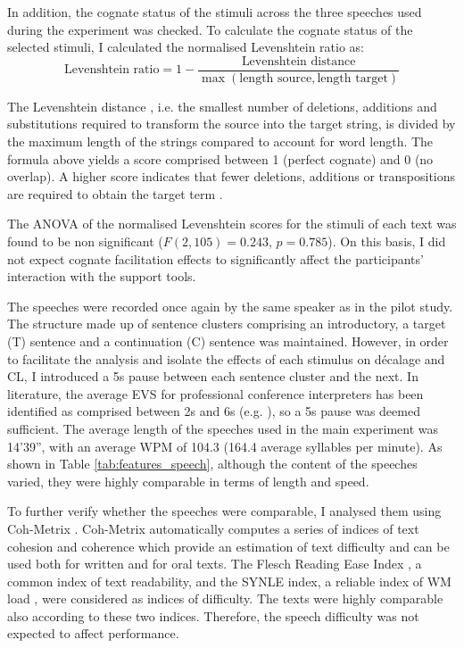 In addition, the cognate status of the stimuli across the three speeches used during the experiment was checked. To calculate the cognate status of the selected stimuli, I calculated the normalised Levenshtein ratio as:
\[\text{Levenshtein ratio}=1 - \frac{\text{Levenshtein distance}}{\max(\text{length source}, \text{length target})}\]

The Levenshtein distance \citep{levenshtein_binary_1966}, i.e. the smallest number of deletions, additions and substitutions required to transform the source into the target string, is divided by the maximum length of the strings compared to account for word length. The formula above yields a score comprised between 1 (perfect cognate) and 0 (no overlap). A higher score indicates that fewer deletions, additions or transpositions are required to obtain the target term \citep{schepens_distributions_2012}.

The ANOVA of the normalised Levenshtein scores for the stimuli of each text was found to be non significant ($F(2,105)=0.243$, $p=0.785$). On this basis, I did not expect cognate facilitation effects to significantly affect the participants' interaction with the support tools.

The speeches were recorded once again by the same speaker as in the pilot study. The structure made up of sentence clusters comprising an introductory, a target (T) sentence and a continuation (C) sentence was maintained. However, in order to facilitate the analysis and isolate the effects of each stimulus on décalage and CL, I introduced a 5s pause between each sentence cluster and the next. In literature, the average EVS for professional conference interpreters has been identified as comprised between 2s and 6s (e.g. \citealt{barik_simultaneous_1973,lederer_simultaneous_1978,oleron_research_2002,christoffels_components_2004,alvstad_time_2011,defrancq_corpus-based_2015}), so a 5s pause was deemed sufficient. The average length of the speeches used in the main experiment was 14'39'', with an average WPM of 104.3 (164.4 average syllables per minute). As shown in Table \ref{tab:features_speech}, although the content of the speeches varied, they were highly comparable in terms of length and speed.

To further verify whether the speeches were comparable, I analysed them using Coh-Metrix \citep{mcnamara_automated_2014}. Coh-Metrix automatically computes a series of indices of text cohesion and coherence which provide an estimation of text difficulty and can be used both for written and for oral texts. The Flesch Reading Ease Index \citep{flesch_new_1948}, a common index of text readability, and the SYNLE index, a reliable index of WM load \citep[70]{mcnamara_automated_2014}, were considered as indices of difficulty. The texts were highly comparable also according to these two indices. Therefore, the speech difficulty was not expected to affect performance.


